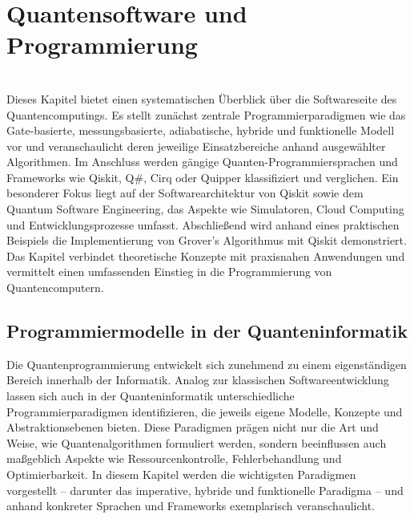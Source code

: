 \chapter{Quantensoftware und Programmierung}
\label{programming} %


\abstract
\\
Dieses Kapitel bietet einen systematischen Überblick über die Softwareseite des Quantencomputings. Es stellt zunächst zentrale Programmierparadigmen wie das Gate-basierte, messungsbasierte, adiabatische, hybride und funktionelle Modell vor und veranschaulicht deren jeweilige Einsatzbereiche anhand ausgewählter Algorithmen. Im Anschluss werden gängige Quanten-Programmiersprachen und Frameworks wie Qiskit, Q\#, Cirq oder Quipper klassifiziert und verglichen. Ein besonderer Fokus liegt auf der Softwarearchitektur von Qiskit sowie dem Quantum Software Engineering, das Aspekte wie Simulatoren, Cloud Computing und Entwicklungsprozesse umfasst. Abschließend wird anhand eines praktischen Beispiels die Implementierung von Grover’s Algorithmus mit Qiskit demonstriert. Das Kapitel verbindet theoretische Konzepte mit praxisnahen Anwendungen und vermittelt einen umfassenden Einstieg in die Programmierung von Quantencomputern.

\section{Programmiermodelle in der Quanteninformatik}
\label{programming-models}

Die Quantenprogrammierung entwickelt sich zunehmend zu einem eigenständigen Bereich innerhalb der Informatik. Analog zur klassischen Softwareentwicklung lassen sich auch in der Quanteninformatik unterschiedliche Programmierparadigmen identifizieren, die jeweils eigene Modelle, Konzepte und Abstraktionsebenen bieten. Diese Paradigmen prägen nicht nur die Art und Weise, wie Quantenalgorithmen formuliert werden, sondern beeinflussen auch maßgeblich Aspekte wie Ressourcenkontrolle, Fehlerbehandlung und Optimierbarkeit. In diesem Kapitel werden die wichtigsten Paradigmen vorgestellt – darunter das imperative, hybride und funktionelle Paradigma – und anhand konkreter Sprachen und Frameworks exemplarisch veranschaulicht.

